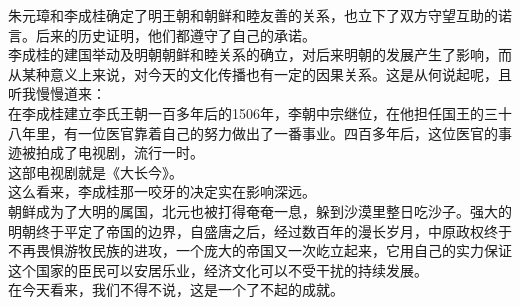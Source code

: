 \begin{multicols}{\theparacolNo}
朱元璋和李成桂确定了明王朝和朝鲜和睦友善的关系，也立下了双方守望互助的诺言。后来的历史证明，他们都遵守了自己的承诺。\\

李成桂的建国举动及明朝朝鲜和睦关系的确立，对后来明朝的发展产生了影响，而从某种意义上来说，对今天的文化传播也有一定的因果关系。这是从何说起呢，且听我慢慢道来：\\

在李成桂建立李氏王朝一百多年后的1506年，李朝中宗继位，在他担任国王的三十八年里，有一位医官靠着自己的努力做出了一番事业。四百多年后，这位医官的事迹被拍成了电视剧，流行一时。\\

这部电视剧就是《大长今》。\\

这么看来，李成桂那一咬牙的决定实在影响深远。\\

朝鲜成为了大明的属国，北元也被打得奄奄一息，躲到沙漠里整日吃沙子。强大的明朝终于平定了帝国的边界，自盛唐之后，经过数百年的漫长岁月，中原政权终于不再畏惧游牧民族的进攻，一个庞大的帝国又一次屹立起来，它用自己的实力保证这个国家的臣民可以安居乐业，经济文化可以不受干扰的持续发展。\\

在今天看来，我们不得不说，这是一个了不起的成就。\\
\ifnum{}
	\end{multicols}
\fi
\newpage
